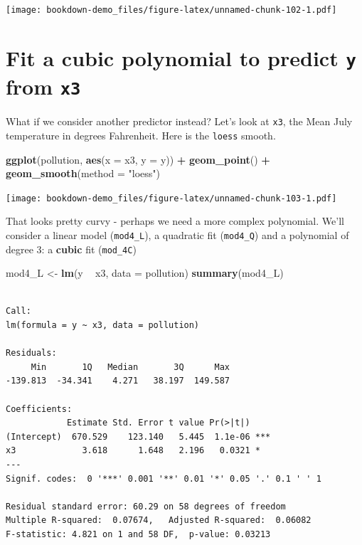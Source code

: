 \documentclass[]{book}
\newenvironment{Shaded}{\begin{snugshade}}{\end{snugshade}}
\newcommand{\KeywordTok}[1]{\textcolor[rgb]{0.13,0.29,0.53}{\textbf{#1}}}
\newcommand{\DataTypeTok}[1]{\textcolor[rgb]{0.13,0.29,0.53}{#1}}
\newcommand{\StringTok}[1]{\textcolor[rgb]{0.31,0.60,0.02}{#1}}
\newcommand{\OperatorTok}[1]{\textcolor[rgb]{0.81,0.36,0.00}{\textbf{#1}}}
\newcommand{\NormalTok}[1]{#1}
\theoremstyle{definition}
\theoremstyle{definition}
\theoremstyle{definition}
\theoremstyle{remark}
\begin{document}
\texttt{[image: bookdown-demo\_files/figure-latex/unnamed-chunk-102-1.pdf]}

\section{\texorpdfstring{Fit a cubic polynomial to predict \texttt{y}
from
\texttt{x3}}{Fit a cubic polynomial to predict y from x3}}\label{fit-a-cubic-polynomial-to-predict-y-from-x3}

What if we consider another predictor instead? Let's look at
\texttt{x3}, the Mean July temperature in degrees Fahrenheit. Here is
the \texttt{loess} smooth.

\begin{Shaded}
\begin{Highlighting}[]
\KeywordTok{ggplot}\NormalTok{(pollution, }\KeywordTok{aes}\NormalTok{(}\DataTypeTok{x =}\NormalTok{ x3, }\DataTypeTok{y =}\NormalTok{ y)) }\OperatorTok{+}
\StringTok{    }\KeywordTok{geom_point}\NormalTok{() }\OperatorTok{+}
\StringTok{    }\KeywordTok{geom_smooth}\NormalTok{(}\DataTypeTok{method =} \StringTok{"loess"}\NormalTok{)}
\end{Highlighting}
\end{Shaded}

\texttt{[image: bookdown-demo\_files/figure-latex/unnamed-chunk-103-1.pdf]}

That looks pretty curvy - perhaps we need a more complex polynomial.
We'll consider a linear model (\texttt{mod4\_L}), a quadratic fit
(\texttt{mod4\_Q}) and a polynomial of degree 3: a \textbf{cubic} fit
(\texttt{mod\_4C})

\begin{Shaded}
\begin{Highlighting}[]
\NormalTok{mod4_L <-}\StringTok{ }\KeywordTok{lm}\NormalTok{(y }\OperatorTok{~}\StringTok{ }\NormalTok{x3, }\DataTypeTok{data =}\NormalTok{ pollution)}
\KeywordTok{summary}\NormalTok{(mod4_L)}
\end{Highlighting}
\end{Shaded}

\begin{verbatim}

Call:
lm(formula = y ~ x3, data = pollution)

Residuals:
     Min       1Q   Median       3Q      Max 
-139.813  -34.341    4.271   38.197  149.587 

Coefficients:
            Estimate Std. Error t value Pr(>|t|)    
(Intercept)  670.529    123.140   5.445  1.1e-06 ***
x3             3.618      1.648   2.196   0.0321 *  
---
Signif. codes:  0 '***' 0.001 '**' 0.01 '*' 0.05 '.' 0.1 ' ' 1

Residual standard error: 60.29 on 58 degrees of freedom
Multiple R-squared:  0.07674,   Adjusted R-squared:  0.06082 
F-statistic: 4.821 on 1 and 58 DF,  p-value: 0.03213
\end{verbatim}
\end{document}
